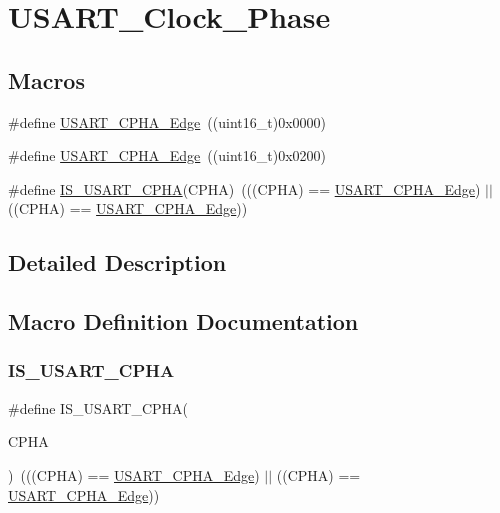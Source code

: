 \hypertarget{group___u_s_a_r_t___clock___phase}{}\section{U\+S\+A\+R\+T\+\_\+\+Clock\+\_\+\+Phase}
\label{group___u_s_a_r_t___clock___phase}
\subsection*{Macros}
\begin{DoxyCompactItemize}
\item 
\#define \mbox{\hyperlink{group___u_s_a_r_t___clock___phase_gab6c0fb052fb9bc418cf368c1a0e4643b}{U\+S\+A\+R\+T\+\_\+\+C\+P\+H\+A\+\_\+Edge}}~((uint16\+\_\+t)0x0000)
\item 
\#define \mbox{\hyperlink{group___u_s_a_r_t___clock___phase_ga66344d0725f1300e9d0f8f1708111f25}{U\+S\+A\+R\+T\+\_\+\+C\+P\+H\+A\+\_\+Edge}}~((uint16\+\_\+t)0x0200)
\item 
\#define \mbox{\hyperlink{group___u_s_a_r_t___clock___phase_ga66fa1a3a757025fcd8dd069a90689f88}{I\+S\+\_\+\+U\+S\+A\+R\+T\+\_\+\+C\+P\+HA}}(C\+P\+HA)~(((C\+P\+HA) == \mbox{\hyperlink{group___u_s_a_r_t___clock___phase_gab6c0fb052fb9bc418cf368c1a0e4643b}{U\+S\+A\+R\+T\+\_\+\+C\+P\+H\+A\+\_\+Edge}}) $\vert$$\vert$ ((C\+P\+HA) == \mbox{\hyperlink{group___u_s_a_r_t___clock___phase_ga66344d0725f1300e9d0f8f1708111f25}{U\+S\+A\+R\+T\+\_\+\+C\+P\+H\+A\+\_\+Edge}}))
\end{DoxyCompactItemize}


\subsection{Detailed Description}


\subsection{Macro Definition Documentation}
\mbox{\label{group___u_s_a_r_t___clock___phase_ga66fa1a3a757025fcd8dd069a90689f88}} 
\subsubsection{\texorpdfstring{IS\_USART\_CPHA}{IS\_USART\_CPHA}}
{\footnotesize\ttfamily \#define I\+S\+\_\+\+U\+S\+A\+R\+T\+\_\+\+C\+P\+HA(\begin{DoxyParamCaption}\item[{}]{C\+P\+HA }\end{DoxyParamCaption})~(((C\+P\+HA) == \mbox{\hyperlink{group___u_s_a_r_t___clock___phase_gab6c0fb052fb9bc418cf368c1a0e4643b}{U\+S\+A\+R\+T\+\_\+\+C\+P\+H\+A\+\_\+Edge}}) $\vert$$\vert$ ((C\+P\+HA) == \mbox{\hyperlink{group___u_s_a_r_t___clock___phase_ga66344d0725f1300e9d0f8f1708111f25}{U\+S\+A\+R\+T\+\_\+\+C\+P\+H\+A\+\_\+Edge}}))}

